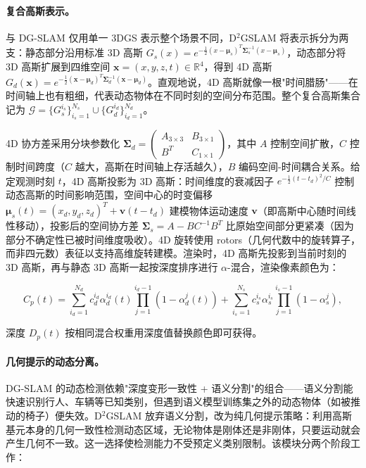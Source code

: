 \paragraph{复合高斯表示。}
与 DG-SLAM 仅用单一 3DGS 表示整个场景不同，D$^2$GSLAM 将表示拆分为两支：静态部分沿用标准 3D 高斯 $G_s(x) = e^{-\frac{1}{2}(x-\boldsymbol{\mu}_s)^T \boldsymbol{\Sigma}_s^{-1}(x-\boldsymbol{\mu}_s)}$，动态部分将 3D 高斯扩展到四维空间 $\mathbf{x} = (x, y, z, t) \in \mathbb{R}^4$，得到 4D 高斯 $G_d(\mathbf{x}) = e^{-\frac{1}{2}(\mathbf{x}-\boldsymbol{\mu}_d)^T \boldsymbol{\Sigma}_d^{-1}(\mathbf{x}-\boldsymbol{\mu}_d)}$。直观地说，4D 高斯就像一根"时间腊肠"——在时间轴上也有粗细，代表动态物体在不同时刻的空间分布范围。整个复合高斯集合记为 $\mathcal{G} = \{G_s^{i_s}\}_{i_s=1}^{N_s} \cup \{G_d^{i_d}\}_{i_d=1}^{N_d}$。

4D 协方差采用分块参数化 $\boldsymbol{\Sigma}_d = \begin{pmatrix} A_{3 \times 3} & B_{3 \times 1} \\ B^T & C_{1 \times 1} \end{pmatrix}$，其中 $A$ 控制空间扩散，$C$ 控制时间跨度（$C$ 越大，高斯在时间轴上存活越久），$B$ 编码空间-时间耦合关系。给定观测时刻 $t$，4D 高斯投影为 3D 高斯：时间维度的衰减因子 $e^{-\frac{1}{2}(t-t_d)^2/C}$ 控制动态高斯的时间影响范围，空间中心的时变偏移 $\boldsymbol{\mu}_s(t) = (x_d, y_d, z_d)^T + \boldsymbol{v}(t - t_d)$ 建模物体运动速度 $\boldsymbol{v}$（即高斯中心随时间线性移动），投影后的空间协方差 $\boldsymbol{\Sigma}_s = A - BC^{-1}B^T$ 比原始空间部分更紧凑（因为部分不确定性已被时间维度吸收）。4D 旋转使用 rotors（几何代数中的旋转算子，而非四元数）表征以支持高维旋转建模。渲染时，4D 高斯先投影到当前时刻的 3D 高斯，再与静态 3D 高斯一起按深度排序进行 $\alpha$-混合，渲染像素颜色为：

\begin{equation*}
C_p(t) = \sum_{i_d=1}^{N_d} c_d^{i_d} \alpha_d^{i_d}(t) \prod_{j=1}^{i_d-1}(1 - \alpha_d^{j}(t)) + \sum_{i_s=1}^{N_s} c_s^{i_s} \alpha_s^{i_s} \prod_{j=1}^{i_s-1}(1 - \alpha_s^{j}),
\end{equation*}

深度 $D_p(t)$ 按相同混合权重用深度值替换颜色即可获得。

\paragraph{几何提示的动态分离。}
DG-SLAM 的动态检测依赖"深度变形一致性 + 语义分割"的组合——语义分割能快速识别行人、车辆等已知类别，但遇到语义模型训练集之外的动态物体（如被推动的椅子）便失效。D$^2$GSLAM 放弃语义分割，改为纯几何提示策略：利用高斯基元本身的几何一致性检测动态区域，无论物体是刚体还是非刚体，只要运动就会产生几何不一致。这一选择使检测能力不受预定义类别限制。该模块分两个阶段工作：


